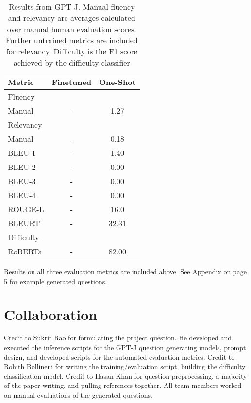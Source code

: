 \documentclass[11pt]{article}
\begin{document}
\begin{table}[h]
\centering
\begin{tabular}{lcc}
\hline
\textbf{Metric} & \textbf{Finetuned} & \textbf{One-Shot}\\
\hline
Fluency & & \\ 
\hspace{0.5cm} Manual & - & 1.27 \\
Relevancy & & \\
\hspace{0.5cm} Manual & - & 0.18 \\
\hspace{0.5cm} BLEU-1 & - & 1.40 \\
\hspace{0.5cm} BLEU-2 & - & 0.00 \\
\hspace{0.5cm} BLEU-3 & - & 0.00 \\
\hspace{0.5cm} BLEU-4 & - & 0.00 \\
\hspace{0.5cm} ROUGE-L & - & 16.0 \\
\hspace{0.5cm} BLEURT & - & 32.31 \\
Difficulty & & \\
\hspace{0.5cm} RoBERTa & - & 82.00 \\
\hline
\end{tabular}
\caption{\label{citation-guide}
Results from GPT-J. Manual fluency and relevancy are averages calculated over manual human evaluation scores. Further untrained metrics are included for relevancy. Difficulty is the F1 score achieved by the difficulty classifier  
}
\end{table}

Results on all three evaluation metrics are included above. See Appendix on page 5 for example generated questions. 

\section{Collaboration}
Credit to Sukrit Rao for formulating the project question. He developed and executed the inference scripts for the GPT-J question generating models, prompt design, and developed scripts for the automated evaluation metrics.
Credit to Rohith Bollineni for writing the training/evaluation script, building the difficulty classification model.
Credit to Hasan Khan for question preprocessing, a majority of the paper writing, and pulling references together. All team members worked on manual evaluations of the generated questions. 
\end{document}
